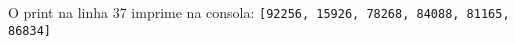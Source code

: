 \documentclass[12pt,varwidth=16cm,border=1pt]{standalone}
\begin{document}
O print na linha 37 imprime na consola:
\newline
\verb+[92256, 15926, 78268, 84088, 81165, 86834]+
\end{document}
